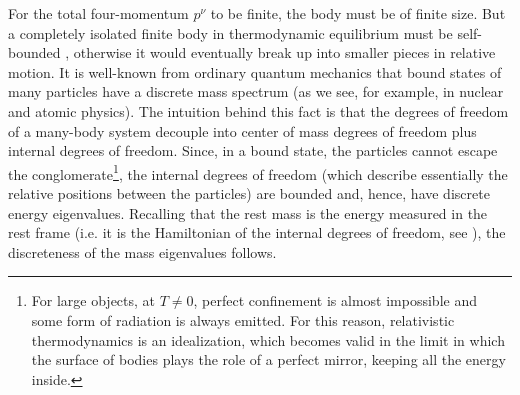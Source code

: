 \documentclass[twocolumn,usenatbib]{mnras2}
\begin{document}
For the total four-momentum $p^\nu$ to be finite, the body must be of finite size. But a completely isolated finite body in thermodynamic equilibrium must be self-bounded \citep{GavassinoTermometri}, otherwise it would eventually break up into smaller pieces in relative motion. It is well-known from ordinary quantum mechanics that bound states of many particles have a discrete mass spectrum (as we see, for example, in nuclear and atomic physics). The intuition behind this fact is that the degrees of freedom of a many-body system decouple into center of mass degrees of freedom plus internal degrees of freedom. Since, in a bound state, the particles cannot escape the conglomerate\footnote{For large objects, at $T\neq 0$, perfect confinement is almost impossible and some form of radiation is always emitted. For this reason, relativistic thermodynamics is an idealization, which becomes valid in the limit in which the surface of bodies plays the role of a perfect mirror, keeping all the energy inside.}, the internal degrees of freedom (which describe essentially the relative positions between the particles) are bounded and, hence, have discrete energy eigenvalues. Recalling that the rest mass is the energy measured in the rest frame (i.e. it is the Hamiltonian of the internal degrees of freedom, see \citealt{Keister1991}), the discreteness of the mass eigenvalues follows.
\end{document}
